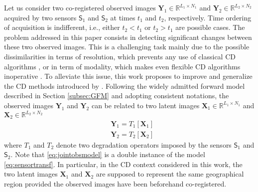 \documentclass[review]{elsarticle}
\newcommand{\Ndim}{L}
\begin{document}
Let us consider two co-registered observed images $\mathbf{Y}_{1} \in \mathbb{R}^{\Ndim_{1} \times N_{1}}$ and $\mathbf{Y}_{2} \in \mathbb{R}^{\Ndim_{2} \times N_{2}}$ acquired by two sensors $\mathsf{S}_{1}$ and $\mathsf{S}_{2}$ at times $t_1$ and $t_2$, respectively. Time ordering of acquisition is indifferent, i.e., either $t_2 < t_1$ or $t_2 > t_1$ are possible cases. The problem addressed
in this paper consists in detecting significant changes between these two observed images. This is a challenging task mainly due to the possible dissimilarities in terms of resolution, which prevents any use of classical CD algorithms \citep{singh_review_1989,bovolo_time_2015}, or in term of modality, which makes even flexible CD algorithms inoperative \citep{ferraris_detecting_2017,ferraris_robust_2017}. To alleviate this issue, this work proposes to improve and generalize the CD methods introduced by \citet{seichepine_soft_2014,gong_coupled_2016,lu_joint_2017}. Following the widely admitted forward model described in Section \ref{subsec:GFM} and adopting consistent notations, the observed images $\mathbf{Y}_{1}$ and $\mathbf{Y}_{2}$ can be related to two latent images $\mathbf{X}_{1} \in \mathbb{R}^{\Ndim_{1} \times N_{1}}$ and $\mathbf{X}_{2} \in \mathbb{R}^{\Ndim_{2} \times N_{2}}$
%
\begin{subequations}
\label{eq:jointobsmodel}
		\begin{align}
			&\mathbf{Y}_{1} = \mathit{T}_{1}[\mathbf{X}_{1}]  \label{eq:jointobsmodel1}\\
			&\mathbf{Y}_{2} = \mathit{T}_{2}[\mathbf{X}_{2}] \label{eq:jointobsmodel2}
		\end{align}
\end{subequations}
%
where $\mathit{T}_{1}$ and $\mathit{T}_{2}$ denote two degradation operators imposed by the sensors $\mathsf{S}_{1}$ and $\mathsf{S}_{2}$. Note that \eqref{eq:jointobsmodel} is a double instance of the model \eqref{eq:sensortransf}. In particular, in the CD context considered in this work, the two latent images $\mathbf{X}_{1}$ and $\mathbf{X}_{2}$ are supposed to represent the same geographical region provided the observed images have been beforehand co-registered.
\end{document}
